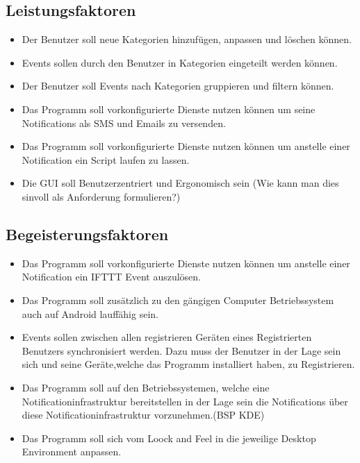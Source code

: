 \documentclass[11pt,titelpage]{scrreprt}
\begin{document}
\subsection{Leistungsfaktoren}
\begin{itemize}
\item
Der Benutzer soll neue Kategorien hinzufügen, anpassen und löschen können.
\item
Events sollen durch den Benutzer in Kategorien eingeteilt werden können.
\item
Der Benutzer soll Events nach Kategorien gruppieren und filtern können.
\item
Das Programm soll vorkonfigurierte Dienste nutzen können um seine Notifications als SMS und Emails zu versenden.
\item
Das Programm soll vorkonfigurierte Dienste nutzen können um anstelle einer Notification ein Script laufen zu lassen.
\item
Die GUI soll Benutzerzentriert und Ergonomisch sein (Wie kann man dies sinvoll als Anforderung formulieren?)
\end{itemize}

\subsection{Begeisterungsfaktoren}


\begin{itemize}
\item
Das Programm soll vorkonfigurierte Dienste nutzen können um anstelle einer Notification  ein IFTTT Event auszulösen.

\item
Das Programm soll zusätzlich zu den gängigen Computer Betriebssystem auch auf Android lauffähig sein.

\item
Events sollen zwischen allen registrieren Geräten eines Registrierten Benutzers synchronisiert werden. Dazu muss der Benutzer in der Lage sein sich und seine Geräte,welche das Programm installiert haben, zu Registrieren.

\item
Das Programm soll auf den Betriebssystemen, welche eine Notificationinfrastruktur bereitstellen  in der Lage sein die Notifications über diese Notificationinfrastruktur vorzunehmen.(BSP KDE)

\item
Das Programm soll sich vom Loock and Feel in die jeweilige Desktop Environment anpassen.

\end{itemize}
\end{document}
